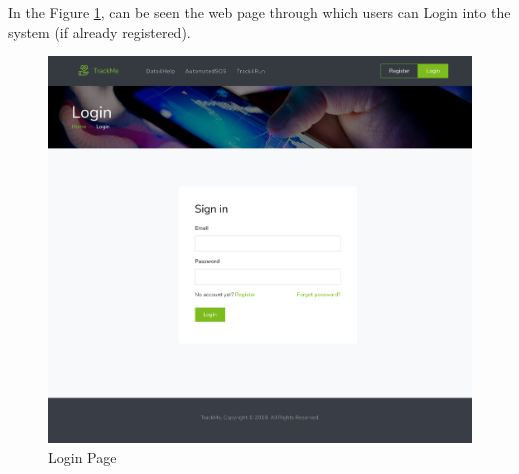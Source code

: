 \documentclass[a4paper, hidelinks, 12pt]{report}
\begin{document}
	In the Figure \ref{fig:Login}, can be seen the web page through which users can Login into the system (if already registered).
	
	\begin{figure}[H]
		\centering
		\includegraphics[scale=0.12]{UI/login.png}
		\caption[UI: Login Page]{Login Page}
		\label{fig:Login}
	\end{figure}
	
\end{document}
